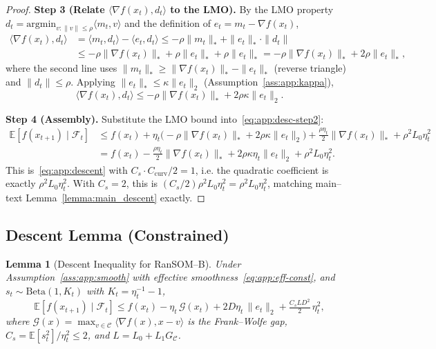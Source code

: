 \documentclass{article}
\theoremstyle{plain}
\newtheorem{lemma}[theorem]{Lemma}
\theoremstyle{definition}
\theoremstyle{remark}
\begin{document}
\begin{proof}
\smallskip\noindent\textbf{Step 3 (Relate $\langle\nabla f(x_t), d_t\rangle$ to the LMO).}
By the LMO property $d_t = \mathrm{argmin}_{v : \|v\| \leq \rho}\langle
m_t, v\rangle$ and the definition of $e_t = m_t - \nabla f(x_t)$,
\begin{align*}
  \langle \nabla f(x_t), d_t\rangle
  &= \langle m_t, d_t\rangle - \langle e_t, d_t\rangle
  \leq -\rho\|m_t\|_* + \|e_t\|_*\cdot\|d_t\|
  \\
  &\leq -\rho\|\nabla f(x_t)\|_* + \rho\|e_t\|_* + \rho\|e_t\|_*
  = -\rho\|\nabla f(x_t)\|_* + 2\rho\|e_t\|_*,
\end{align*}
where the second line uses $\|m_t\|_* \geq \|\nabla f(x_t)\|_* -
\|e_t\|_*$ (reverse triangle) and $\|d_t\| \leq \rho$. Applying
$\|e_t\|_* \leq \kappa\|e_t\|_2$ (Assumption~\ref{ass:app:kappa}),
\[
  \langle \nabla f(x_t), d_t\rangle
  \leq -\rho\|\nabla f(x_t)\|_* + 2\rho\kappa\|e_t\|_2.
\]

\smallskip\noindent\textbf{Step 4 (Assembly).}
Substitute the LMO bound into~\eqref{eq:app:desc-step2}:
\begin{align*}
  \mathbb{E}[f(x_{t+1}) \mid \mathcal{F}_t]
  &\leq f(x_t) + \eta_t\bigl(-\rho\|\nabla f(x_t)\|_* + 2\rho\kappa\|e_t\|_2\bigr)
    + \tfrac{\rho\eta_t}{2}\|\nabla f(x_t)\|_* + \rho^2 L_0\eta_t^2
  \\
  &= f(x_t) - \tfrac{\rho\eta_t}{2}\|\nabla f(x_t)\|_*
    + 2\rho\kappa\eta_t\|e_t\|_2 + \rho^2 L_0\eta_t^2.
\end{align*}
This is~\eqref{eq:app:descent} with $C_s \cdot C_{\mathrm{curv}} / 2 = 1$,
i.e. the quadratic coefficient is exactly $\rho^2 L_0 \eta_t^2$. With
$C_s = 2$, this is $(C_s/2)\rho^2 L_0\eta_t^2 = \rho^2 L_0\eta_t^2$,
matching main--text Lemma~\ref{lemma:main_descent} exactly.
\end{proof}


\subsection{Descent Lemma (Constrained)}
\label{app:descent-b}

\begin{lemma}[Descent Inequality for RanSOM--B]
\label{lem:app:descent-b}
Under Assumption~\ref{ass:app:smooth} with effective
smoothness~\eqref{eq:app:eff-const}, and $s_t \sim \mathrm{Beta}(1, K_t)$
with $K_t = \eta_t^{-1} - 1$,
\begin{equation}
  \mathbb{E}[f(x_{t+1}) \mid \mathcal{F}_t]
  \leq f(x_t) - \eta_t\, \mathcal{G}(x_t)
    + 2D\eta_t\, \|e_t\|_2 + \tfrac{C_s L D^2}{2}\, \eta_t^2,
  \label{eq:app:descent-b}
\end{equation}
where $\mathcal{G}(x) = \max_{v \in \mathcal{C}}\langle \nabla f(x), x -
v\rangle$ is the Frank--Wolfe gap, $C_s = \mathbb{E}[s_t^2]/\eta_t^2 \leq
2$, and $L = L_0 + L_1 G_\mathcal{C}$.
\end{lemma}
\end{document}
